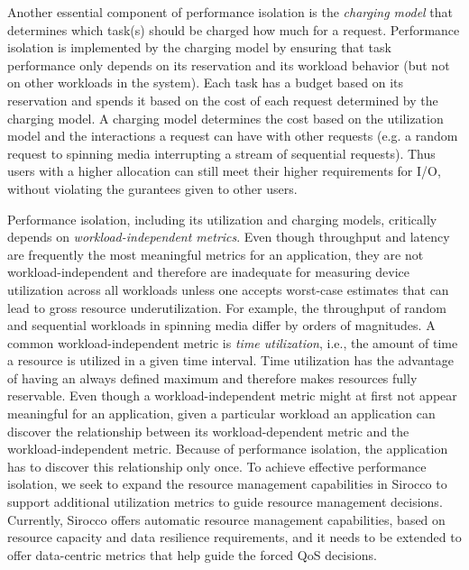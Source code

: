 Another essential component of performance isolation is the \emph{charging
model} that determines which task(s) should be charged how much for a request.
Performance isolation is implemented by the charging model by ensuring that
task performance only depends on its reservation and its workload behavior (but
not on other workloads in the system). Each task has a budget based on its
reservation and spends it based on the cost of each request determined by the
charging model. A charging model determines the cost based on the utilization
model and the interactions a request can have with other requests (e.g. a
random request to spinning media interrupting a stream of sequential
requests). Thus users with a higher allocation can still meet their higher
requirements for I/O, without violating the gurantees given to other users. 

Performance isolation, including its utilization and charging models,
critically depends on \emph{workload-independent metrics}. Even though
throughput and latency are frequently the most meaningful metrics for an
application, they are not workload-independent and therefore are inadequate for
measuring device utilization across all workloads unless one accepts
worst-case estimates that can lead to gross resource underutilization. For
example, the throughput of random and sequential workloads in spinning media
differ by orders of magnitudes. A common workload-independent metric is
\emph{time utilization}, i.e., the amount of time a resource is utilized in a
given time interval. Time utilization has the advantage of having an always
defined maximum and therefore makes resources fully reservable. Even though a
workload-independent metric might at first not appear meaningful for an
application, given a particular workload an application can discover the
relationship between its workload-dependent metric and the workload-independent
metric.  Because of performance isolation, the application has to discover this
relationship only once.  To achieve effective performance isolation, we seek to
expand the resource management capabilities in Sirocco to support additional
utilization metrics to guide resource management decisions. Currently, Sirocco
offers automatic resource management capabilities, based on resource capacity
and data resilience requirements, and it needs to be extended to offer
data-centric metrics that help guide the forced QoS decisions.

